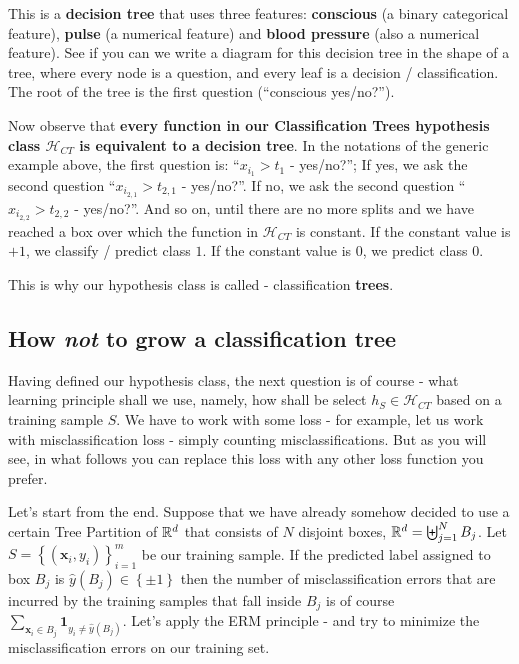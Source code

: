 \documentclass[11pt]{article}
\newcommand{\Hc}{\mathcal{H}}
\newcommand{\VV}[1]{\mathbf{#1}}
\begin{document}
 This is a {\bf decision tree} that uses three features: {\bf conscious} (a
 binary categorical feature), {\bf pulse} (a numerical feature) and {\bf blood
 pressure} (also a numerical feature). See if you can we write a diagram for
 this decision tree in the shape of a tree, where every node is a question, and
 every leaf is a decision / classification. The root of the tree is the first
 question (``conscious yes/no?'').

 Now observe that {\bf every function in our Classification Trees 
   hypothesis class  $\Hc_{CT}$ is
 equivalent to a decision tree}. In the notations  of the generic example above, 
 the first question is: ``$x_{i_1} > t_1$ - yes/no?''; If yes, we ask the second
 question ``$x_{i_{2,1}} > t_{2,1}$ - yes/no?''. If no, we ask the second question
 ``$x_{i_{2,2}} > t_{2,2}$ - yes/no?''. And so on, until there are no more splits and we
 have reached a box over which 
 the function in $\Hc_{CT}$ is constant. If the constant value is $+1$, we
 classify / predict class $1$. If the constant value is $0$, we predict class
 $0$. 

 This is why our hypothesis class is called - classification {\bf trees}.

 \subsection{How {\em not} to grow a classification tree}

 Having defined our hypothesis class, the next question is of course - what
 learning principle shall we use, namely, how shall be select $h_S\in\Hc_{CT}$
 based on a training sample $S$. We have to work with some loss - for example,
 let us work with misclassification loss - simply counting misclassifications.
 But as you will see, in what follows you can replace this  loss with any other
 loss function you prefer. 

 Let's start from the end. Suppose that we have already somehow 
 decided to use a certain Tree Partition of $\mathbb{R}^d$ that consists of $N$ disjoint boxes,
 $\mathbb{R}^d=\biguplus_{j=1}^N B_j$. Let $S=\left\{ (\VV{x}_i,y_i)
 \right\}_{i=1}^m$ be our training sample.
 If the predicted
 label assigned to box $B_j$ is $\hat{y}(B_j)\in\left\{ \pm 1 \right\}$ then 
 the number of misclassification errors that are incurred by the training
 samples that fall inside $B_j$ is of course $\sum_{ \VV{x}_i\in B_j
 }\mathbf{1}_{y_i\neq\hat{y}(B_j)}$. Let's apply the ERM principle - and try to
 minimize the misclassification errors on our training set. 
 
\end{document}
